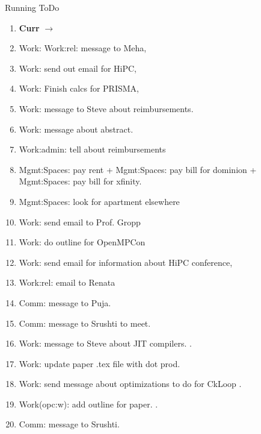 \begin{columns}
\begin{column}{0.6\linewidth}
      \begin{block}{Running ToDo} %
        \begin{enumerate} 
        \item \tiny \textbf{Curr} $\rightarrow$ 
        \item \tiny Work:  Work:rel: message to Meha, 
        \item \tiny Work: send out email for HiPC, 
        \item \tiny Work: Finish calcs for PRISMA, 
        \item \tiny Work: message to Steve about reimbursements. 

        \item \tiny Work: message about abstract.  
        \item \tiny Work:admin: tell about reimbursements 
        \item \tiny Mgmt:Spaces: pay rent + Mgmt:Spaces: pay bill for dominion + Mgmt:Spaces: pay
          bill for xfinity. 

        \item \tiny  Mgmt:Spaces: look for apartment elsewhere
          
        \item \tiny Work: send email to Prof. Gropp
        \item \tiny Work: do outline for OpenMPCon
        \item \tiny Work: send email for information about HiPC conference, 
        \item \tiny Work:rel: email to Renata
        \item \tiny Comm: message to Puja. 

        \item \tiny Comm: message to Srushti to meet.    
        \item \tiny Work: message to Steve about JIT compilers.  \dl{} \pr{}. 


        \item \tiny Work: update paper .tex file with dot prod. 

        \item \tiny Work: send message about optimizations to do for CkLoop  .
          
        \item \tiny Work(opc:w): add outline for paper. .

        \item \tiny Comm: message to Srushti. 


\end{enumerate}
\end{block}
\end{column}
\end{columns}
